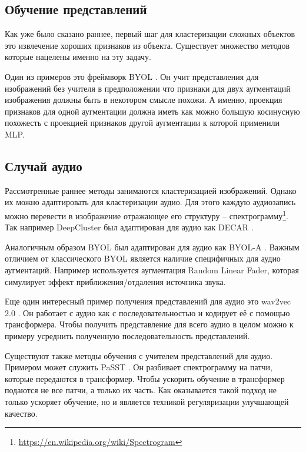 \documentclass[a4paper,12pt]{extarticle}
\begin{document}
\subsection{Обучение представлений}

Как уже было сказано раннее, первый шаг для кластеризации
сложных объектов это извлечение хороших признаков из объекта.
Существует множество методов которые нацелены именно на эту задачу.

Один из примеров это фреймворк BYOL \cite{NEURIPS2020_f3ada80d}.
Он учит представления для изображений без учителя в предположении 
что признаки для двух аугментаций изображения должны быть 
в некотором смысле похожи. А именно, проекция признаков для 
одной аугментации должна иметь как можно большую косинусную 
похожесть с проекцией признаков другой аугментации к которой 
применили MLP.

\subsection{Случай аудио}

Рассмотренные раннее методы занимаются кластеризацией 
изображений. Однако их можно адаптировать для кластеризации 
аудио. Для этого каждую аудиозапись можно перевести в 
изображение отражающее его структуру -- спектрограмму\footnote{\url{https://en.wikipedia.org/wiki/Spectrogram}}.
Так например DeepCluster был адаптирован для аудио как 
DECAR \cite{Ghosh2022DECARDC}.

Аналогичным образом BYOL был адаптирован для аудио как 
BYOL-A \cite{BYOL_A}. Важным отличием от классического
BYOL является наличие специфичных для аудио аугментаций.
Например используется аугментация Random Linear Fader, 
которая симулирует эффект приближения/отдаления источника
звука.

Еще один интересный пример получения представлений 
для аудио это wav2vec 2.0 \cite{NEURIPS2020_92d1e1eb}. 
Он работает с аудио как с последовательностью и кодирует 
её с помощью трансформера. Чтобы получить представление 
для всего аудио в целом можно к примеру усреднить полученную
последовательность представлений. 

Существуют также методы обучения с учителем 
представлений для аудио. Примером может служить 
PaSST \cite{Koutini2021EfficientTO}. Он разбивает 
спектрограмму на патчи, которые передаются в трансформер. 
Чтобы ускорить обучение в трансформер подаются не все 
патчи, а только их часть. Как оказывается такой подход не 
только ускоряет обучение, но и является техникой регуляризации
улучшающей качество.
\end{document}

